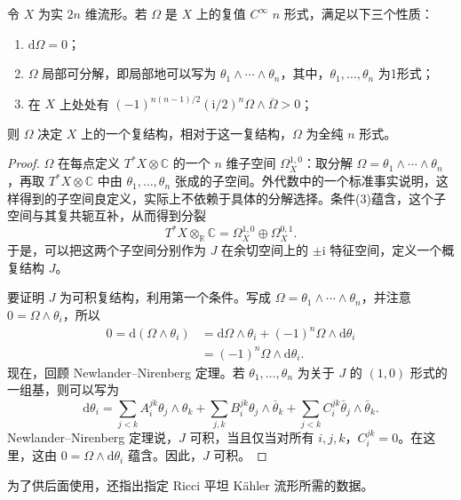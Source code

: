 \begin{proposition}\label{prop:6.24}
令 $X$ 为实 $2n$ 维流形。若 $\Omega$ 是 $X$ 上的复值 $C^\infty$ $n$ 形式，满足以下三个性质：
\begin{enumerate}[label=(\arabic*)]
\item $\mathrm d\Omega=0$；
\item $\Omega$ 局部可分解，即局部地可以写为 $\theta_1\wedge\cdots\wedge\theta_n$，其中，$\theta_1,\ldots,\theta_n$ 为1形式；
\item 在 $X$ 上处处有 $(-1)^{n(n-1)/2}(\mathrm i/2)^n\Omega\wedge\overline\Omega>0$；
\end{enumerate}
则 $\Omega$ 决定 $X$ 上的一个复结构，相对于这一复结构，$\Omega$ 为全纯 $n$ 形式。
\end{proposition}
\begin{proof}
$\Omega$ 在每点定义 $T^*X\otimes\mathbb C$ 的一个 $n$ 维子空间 $\Omega_X^{1,0}$：取分解 $\Omega=\theta_1\wedge\cdots\wedge\theta_n$，再取 $T^*X\otimes\mathbb C$ 中由 $\theta_1,\ldots,\theta_n$ 张成的子空间。外代数中的一个标准事实说明，这样得到的子空间良定义，实际上不依赖于具体的分解选择。条件(3)蕴含，这个子空间与其复共轭互补，从而得到分裂
\[
T^*X\otimes_{\mathbb R}\mathbb C=\Omega_X^{1,0}\oplus\Omega_X^{0,1}.
\]
于是，可以把这两个子空间分别作为 $J$ 在余切空间上的 $\pm\mathrm i$ 特征空间，定义一个概复结构 $J$。

要证明 $J$ 为可积复结构，利用第一个条件。写成 $\Omega=\theta_1\wedge\cdots\wedge\theta_n$，并注意 $0=\Omega\wedge\theta_i$，所以
\[
\begin{aligned}
0=\mathrm d(\Omega\wedge\theta_i)
&=\mathrm d\Omega\wedge\theta_i+(-1)^n\Omega\wedge\mathrm d\theta_i\\
&=(-1)^n\Omega\wedge\mathrm d\theta_i.
\end{aligned}
\]
现在，回顾 Newlander--Nirenberg 定理。若 $\theta_1,\ldots,\theta_n$ 为关于 $J$ 的 $(1,0)$ 形式的一组基，则可以写为
\[
\mathrm d\theta_i
=\sum_{j<k}A_i^{jk}\theta_j\wedge\theta_k
+\sum_{j,k}B_i^{jk}\theta_j\wedge\bar\theta_k
+\sum_{j<k}C_i^{jk}\bar\theta_j\wedge\bar\theta_k.
\]
Newlander--Nirenberg 定理说，$J$ 可积，当且仅当对所有 $i,j,k$，$C_i^{jk}=0$。在这里，这由 $0=\Omega\wedge\mathrm d\theta_i$ 蕴含。因此，$J$ 可积。
\end{proof}

为了供后面使用，还指出指定 Ricci 平坦 Kähler 流形所需的数据。

